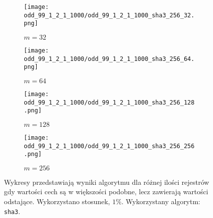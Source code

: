 \begin{figure}[H]
    \begin{subfigure}{0.5\textwidth}
        \texttt{[image: odd\_99\_1\_2\_1\_1000/odd\_99\_1\_2\_1\_1000\_sha3\_256\_32.png]}
        \caption{$m = 32$}
        \label{fig:subim1}
    \end{subfigure}
    \begin{subfigure}{0.5\textwidth}
        \texttt{[image: odd\_99\_1\_2\_1\_1000/odd\_99\_1\_2\_1\_1000\_sha3\_256\_64.png]}
        \caption{$m = 64$}
        \label{fig:subim1}
    \end{subfigure}
    \begin{subfigure}{0.5\textwidth}
        \texttt{[image: odd\_99\_1\_2\_1\_1000/odd\_99\_1\_2\_1\_1000\_sha3\_256\_128.png]}
        \caption{$m = 128$}
        \label{fig:subim2}
    \end{subfigure}
    \begin{subfigure}{0.5\textwidth}
        \texttt{[image: odd\_99\_1\_2\_1\_1000/odd\_99\_1\_2\_1\_1000\_sha3\_256\_256.png]}
        \caption{$m = 256$}
        \label{fig:subim2}
    \end{subfigure}

    \caption{Wykresy przedstawiają wyniki algorytmu dla różnej ilości rejestrów gdy wartości cech są w większości podobne, lecz zawierają wartości odstające. Wykorzystano stosunek, $1\%$. Wykorzystany algorytm: \texttt{sha3}.}
    \label{fig:uniform_sha3_256}
\end{figure}
